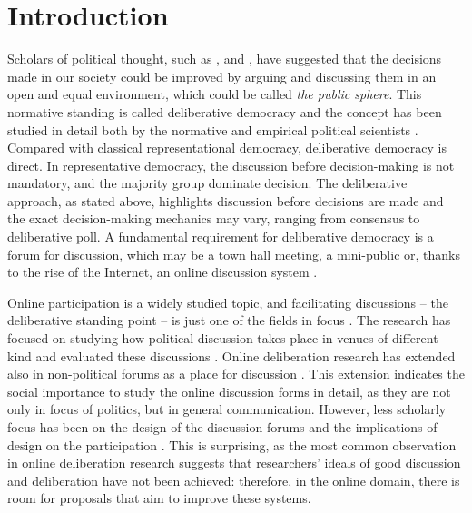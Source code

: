 \documentclass{article}
\begin{document}
\newpage

\setcounter{page}{1}

\section{Introduction}

Scholars of political thought, such as ,  and , have suggested that the decisions made in our society could be improved by arguing and discussing them in an open and equal environment, which could be called \textit{the public sphere}. This normative standing is called deliberative democracy and the concept has been studied in detail both by the normative and empirical political scientists . Compared with classical representational democracy, deliberative democracy is direct. In representative democracy, the discussion before decision-making is not mandatory, and the majority group dominate decision. The deliberative approach, as stated above, highlights discussion before decisions are made and the exact decision-making mechanics may vary, ranging from consensus to deliberative poll. A fundamental requirement for deliberative democracy is a forum for discussion, which may be a town hall meeting, a mini-public or, thanks to the rise of the Internet, an online discussion system .

Online participation is a widely studied topic, and facilitating discussions -- the deliberative standing point -- is just one of the fields in focus . The research has focused on studying how political discussion takes place in venues of different kind  and evaluated these discussions . Online deliberation research has extended also in non-political forums as a place for discussion \cite{graham12}. This extension indicates the social importance to study the online discussion forms in detail, as they are not only in focus of politics, but in general communication. However, less scholarly focus has been on the design of the discussion forums and the implications of design on the participation . This is surprising, as the most common observation in online deliberation research suggests that researchers' ideals of good discussion and deliberation have not been achieved: therefore, in the online domain, there is room for proposals that aim to improve these systems.
\end{document}
